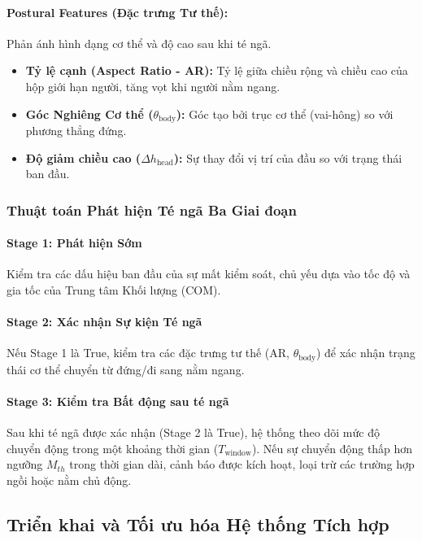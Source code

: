 \paragraph{Postural Features (Đặc trưng Tư thế):} Phản ánh hình dạng cơ thể và độ cao sau khi té ngã.
\begin{itemize}
    \item \textbf{Tỷ lệ cạnh (Aspect Ratio - AR):} Tỷ lệ giữa chiều rộng và chiều cao của hộp giới hạn người, tăng vọt khi người nằm ngang.
    \item \textbf{Góc Nghiêng Cơ thể ($\theta_{\text{body}}$):} Góc tạo bởi trục cơ thể (vai-hông) so với phương thẳng đứng.
    \item \textbf{Độ giảm chiều cao ($\Delta h_{\text{head}}$):} Sự thay đổi vị trí của đầu so với trạng thái ban đầu.
\end{itemize}

\subsubsection{Thuật toán Phát hiện Té ngã Ba Giai đoạn}

\paragraph{Stage 1: Phát hiện Sớm}
Kiểm tra các dấu hiệu ban đầu của sự mất kiểm soát, chủ yếu dựa vào tốc độ và gia tốc của Trung tâm Khối lượng (COM).

\paragraph{Stage 2: Xác nhận Sự kiện Té ngã}
Nếu Stage 1 là True, kiểm tra các đặc trưng tư thế (AR, $\theta_{\text{body}}$) để xác nhận trạng thái cơ thể chuyển từ đứng/đi sang nằm ngang.

\paragraph{Stage 3: Kiểm tra Bất động sau té ngã}
Sau khi té ngã được xác nhận (Stage 2 là True), hệ thống theo dõi mức độ chuyển động trong một khoảng thời gian ($T_{\text{window}}$). Nếu sự chuyển động thấp hơn ngưỡng $M_{th}$ trong thời gian dài, cảnh báo được kích hoạt, loại trừ các trường hợp ngồi hoặc nằm chủ động.

\subsection{Triển khai và Tối ưu hóa Hệ thống Tích hợp}

